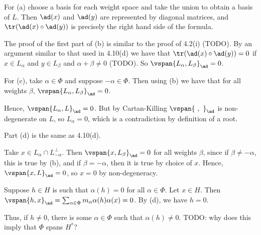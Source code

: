 For (a) choose a basis for each weight space and take the union to obtain
a basis of $L$. Then $\ad(x)$ and $\ad(y)$ are represented by diagonal matrices,
and $\tr(\ad(x) \circ \ad(y))$ is precisely the right hand side of the formula.

The proof of the first part of (b) is similar to the proof of 4.2(i) (TODO). By
an argument similar to that used in 4.10(d) we have that
$\tr(\ad(x) \circ \ad(y)) = 0$ if $x \in L_{\alpha}$ and $y \in L_{\beta}$ and
$\alpha+\beta\neq 0$ (TODO). So $\vspan{L_\alpha, L_{\beta}}_{\ad} = 0$.

For (c), take $\alpha \in \Phi$ and suppose $-\alpha \in \Phi$. Then using (b) we
have that for all weights $\beta$, $\vspan{L_\alpha, L_\beta}_{\ad} = 0$.

Hence, $\vspan{L_{\alpha}, L}_{\ad} = 0$. But by Cartan-Killing
$\vspan{\ ,\ }_{\ad}$ is non-degenerate on $L$, so $L_{\alpha} = 0$, which is
a contradiction by definition of a root.

Part (d) is the same as 4.10(d).

Take $x \in L_\alpha \cap L_{-\alpha}^\perp$. Then
$\vspan{x, L_\beta}_{\ad} = 0$ for all weights $\beta$, since if $\beta \neq -\alpha$,
this is true by (b), and  if $\beta = -\alpha$, then it is true by
choice of $x$. Hence, $\vspan{x, L}_{\ad} = 0$, so $x = 0$ by non-degeneracy.

Suppose $h \in H$ is such that $\alpha(h) = 0$ for all $\alpha \in \Phi$. Let
$x \in H$. Then $\vspan{h, x}_{\ad} = \sum_{\alpha \in \Phi}m_\alpha\alpha(h)\alpha(x) = 0$.
By (d), we have $h = 0$.

Thus, if $h\neq 0$, there is some $\alpha \in\Phi$ such that $\alpha(h)\neq 0$.
TODO: why does this imply that $\Phi$ spans $H^*$?

